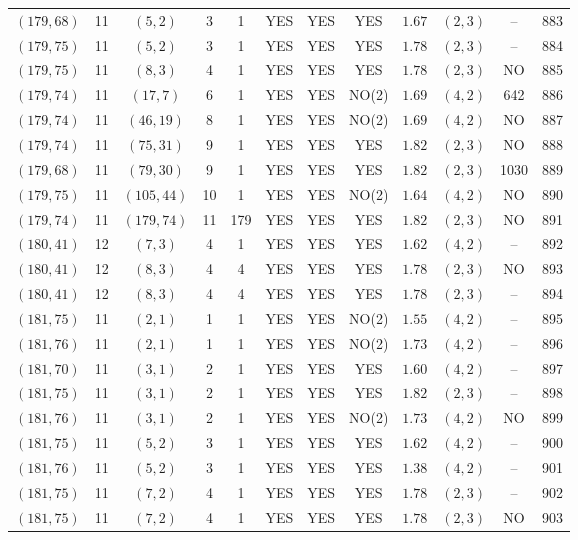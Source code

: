 \begin{longtable}{|c|c|c|c|c|c|c|c|c|c|c|c|}
$(179,68)$ & 11 & $(5,2)$ & 3 & 1 & YES & YES & YES & $1.67$ & $(2,3)$ & -- & 883\\
$(179,75)$ & 11 & $(5,2)$ & 3 & 1 & YES & YES & YES & $1.78$ & $(2,3)$ & -- & 884\\
$(179,75)$ & 11 & $(8,3)$ & 4 & 1 & YES & YES & YES & $1.78$ & $(2,3)$ & NO & 885\\
$(179,74)$ & 11 & $(17,7)$ & 6 & 1 & YES & YES & NO(2) & $1.69$ & $(4,2)$ & 642 & 886\\
$(179,74)$ & 11 & $(46,19)$ & 8 & 1 & YES & YES & NO(2) & $1.69$ & $(4,2)$ & NO & 887\\
$(179,74)$ & 11 & $(75,31)$ & 9 & 1 & YES & YES & YES & $1.82$ & $(2,3)$ & NO & 888\\
$(179,68)$ & 11 & $(79,30)$ & 9 & 1 & YES & YES & YES & $1.82$ & $(2,3)$ & 1030 & 889\\
$(179,75)$ & 11 & $(105,44)$ & 10 & 1 & YES & YES & NO(2) & $1.64$ & $(4,2)$ & NO & 890\\
$(179,74)$ & 11 & $(179,74)$ & 11 & 179 & YES & YES & YES & $1.82$ & $(2,3)$ & NO & 891\\
$(180,41)$ & 12 & $(7,3)$ & 4 & 1 & YES & YES & YES & $1.62$ & $(4,2)$ & -- & 892\\
$(180,41)$ & 12 & $(8,3)$ & 4 & 4 & YES & YES & YES & $1.78$ & $(2,3)$ & NO & 893\\
$(180,41)$ & 12 & $(8,3)$ & 4 & 4 & YES & YES & YES & $1.78$ & $(2,3)$ & -- & 894\\
$(181,75)$ & 11 & $(2,1)$ & 1 & 1 & YES & YES & NO(2) & $1.55$ & $(4,2)$ & -- & 895\\
$(181,76)$ & 11 & $(2,1)$ & 1 & 1 & YES & YES & NO(2) & $1.73$ & $(4,2)$ & -- & 896\\
$(181,70)$ & 11 & $(3,1)$ & 2 & 1 & YES & YES & YES & $1.60$ & $(4,2)$ & -- & 897\\
$(181,75)$ & 11 & $(3,1)$ & 2 & 1 & YES & YES & YES & $1.82$ & $(2,3)$ & -- & 898\\
$(181,76)$ & 11 & $(3,1)$ & 2 & 1 & YES & YES & NO(2) & $1.73$ & $(4,2)$ & NO & 899\\
$(181,75)$ & 11 & $(5,2)$ & 3 & 1 & YES & YES & YES & $1.62$ & $(4,2)$ & -- & 900\\
$(181,76)$ & 11 & $(5,2)$ & 3 & 1 & YES & YES & YES & $1.38$ & $(4,2)$ & -- & 901\\
$(181,75)$ & 11 & $(7,2)$ & 4 & 1 & YES & YES & YES & $1.78$ & $(2,3)$ & -- & 902\\
$(181,75)$ & 11 & $(7,2)$ & 4 & 1 & YES & YES & YES & $1.78$ & $(2,3)$ & NO & 903\\

\end{longtable}
